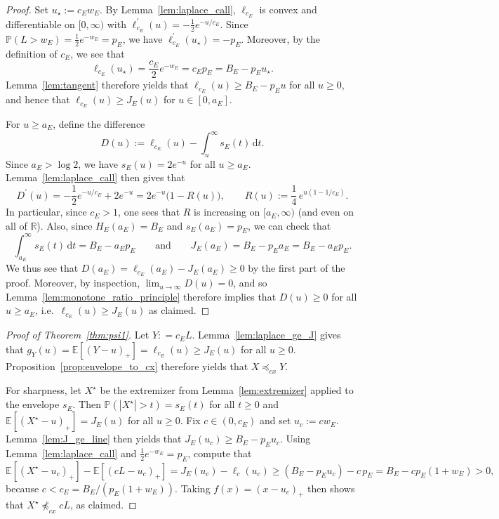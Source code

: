 \documentclass[11pt]{article}
\newcommand{\Pbb}{\mathbb{P}}
\newcommand{\Ebb}{\mathbb{E}}
\begin{document}
\begin{proof}
Set $u_\star :=c_E w_E$. 
By Lemma~\ref{lem:laplace_call}, $\ell_{c_E}$ is convex and differentiable on $[0, \infty)$ with $\ell_{c_E}^{\prime} (u) = - \frac12 e^{-u/c_E}$. 
Since $\Pbb(L > w_E) = \frac12 e^{-w_E} = p_E$, we have $\ell_{c_E}^{\prime}(u_\star) = - p_E$.
Moreover, by the definition of $c_E$, we see that
%
\[
\ell_{c_E} (u_\star) = \frac{c_E}{2} e^{-w_E} = c_E p_E = B_E - p_E u_\star.
\]
%
Lemma~\ref{lem:tangent} therefore yields that $\ell_{c_E}(u)\ge B_E - p_E u$ for all $u\ge 0$, and hence that
$\ell_{c_E} (u) \ge J_E (u)$ for $u \in [0, a_E]$.

For $u\ge a_E$, define the difference
%
\[
D(u) := \ell_{c_E} (u) - \int_u^\infty s_E (t) \, \mathrm{d}t.
\]
%
Since $a_E > \log 2$, we have $s_E (u) = 2e^{-u}$ for all $u \ge a_E$. Lemma~\ref{lem:laplace_call} then gives that
%
\[
D^{\prime} (u) = - \frac12 e^{-u/c_E} + 2 e^{-u} = 2 e^{-u} \bigl(1 - R (u)\bigr),
\qquad
R (u) := \frac14 \, e^{u (1 - 1/c_E)}.
\]
%
In particular, since $c_E > 1$, one sees that $R$ is increasing on $[a_E,\infty)$ (and even on all of $\mathbb{R}$). Also, since $H_E (a_E) = B_E$ and $s_E (a_E) = p_E$, we can check that
%
\[
\int_{a_E}^\infty s_E(t)\, \mathrm{d}t = B_E - a_E p_E
\qquad \text{and} \qquad 
J_E (a_E) = B_E - p_E a_E = B_E - a_E p_E.
\]
%
We thus see that $D (a_E) = \ell_{c_E} (a_E) - J_E (a_E)\ge 0$ by the first part of the proof. Moreover, by inspection, $\lim_{u\to\infty} D (u) = 0$, and so Lemma~\ref{lem:monotone_ratio_principle} therefore implies that $D(u) \ge 0$ for all $u \ge a_E$, i.e.\ $\ell_{c_E} (u) \ge J_E (u)$ as claimed.
\end{proof}

\begin{proof}[Proof of Theorem~\ref{thm:psi1}]
Let $Y: = c_E L$. 
Lemma~\ref{lem:laplace_ge_J} gives that $g_Y (u) = \Ebb [(Y - u)_+] = \ell_{c_E} (u)\ge J_E (u)$ for all $u \ge 0$.
Proposition~\ref{prop:envelope_to_cx} therefore yields that $X\preceq_{cx}Y$.

For sharpness, let $X^\star$ be the extremizer from Lemma~\ref{lem:extremizer} applied to the envelope $s_E$.
Then $\Pbb(|X^\star| > t) = s_E(t)$ for all $t\ge 0$ and $\Ebb[(X^\star - u)_+] = J_E (u)$ for all $u\ge 0$.
Fix $c\in (0, c_E)$ and set $u_c := c w_E$.
Lemma~\ref{lem:J_ge_line} then yields that $J_E (u_c) \ge B_E - p_E u_c$. 
Using Lemma~\ref{lem:laplace_call} and $\frac12 e^{-w_E} = p_E$, compute that
%
\[
\Ebb [(X^\star - u_c)_+]-\Ebb[(c L - u_c)_+]
= J_E (u_c) - \ell_c (u_c)
\ge (B_E - p_E u_c) - c \, p_E
= B_E - c p_E (1 + w_E) > 0,
\]
%
because $c < c_E = B_E / (p_E (1 + w_E))$. Taking $f(x) = (x - u_c)_+$ then shows that $X^\star \not \preceq_{cx} cL$, as claimed.
\end{proof}
\end{document}
